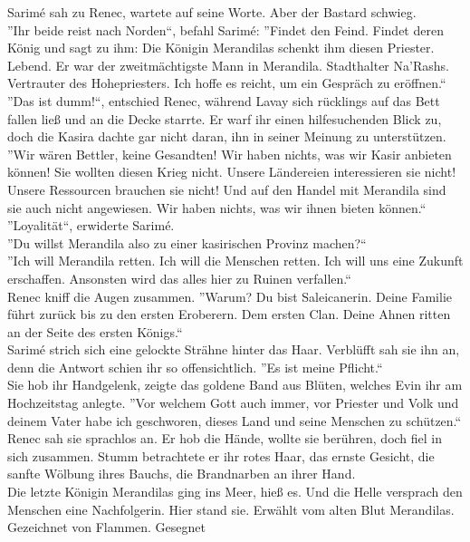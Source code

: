 Sarimé sah zu Renec, wartete auf seine Worte. Aber der Bastard schwieg.\\
''Ihr beide reist nach Norden``, befahl Sarimé: ''Findet den Feind. Findet deren König und 
sagt zu ihm: Die Königin Merandilas schenkt ihm diesen Priester. Lebend. Er war der zweitmächtigste 
Mann in Merandila. Stadthalter Na'Rashs. Vertrauter des Hohepriesters. Ich hoffe es reicht, um ein 
Gespräch zu eröffnen.``\\
''Das ist dumm!``, entschied Renec, während Lavay sich rücklings auf das Bett fallen ließ und an 
die Decke starrte. Er warf ihr einen hilfesuchenden Blick zu, doch die Kasira dachte gar nicht 
daran, ihn in seiner Meinung zu unterstützen.\\
''Wir wären Bettler, keine Gesandten! Wir haben nichts, was wir Kasir anbieten können! Sie wollten 
diesen Krieg nicht. Unsere Ländereien interessieren sie nicht! Unsere Ressourcen brauchen sie 
nicht! Und auf den Handel mit Merandila sind sie auch nicht angewiesen. Wir haben nichts, was wir 
ihnen bieten können.``\\
''Loyalität``, erwiderte Sarimé.\\
''Du willst Merandila also zu einer kasirischen Provinz machen?``\\
''Ich will Merandila retten. Ich will die Menschen retten. Ich will uns eine Zukunft erschaffen. 
Ansonsten wird das alles hier zu Ruinen verfallen.``\\
Renec kniff die Augen zusammen. ''Warum? Du bist Saleicanerin. Deine Familie führt zurück bis zu 
den ersten Eroberern. Dem ersten Clan. Deine Ahnen ritten an der Seite des ersten Königs.``\\
Sarimé strich sich eine gelockte Strähne hinter das Haar. Verblüfft sah sie ihn an, denn die 
Antwort schien ihr so offensichtlich. ''Es ist meine Pflicht.``\\
Sie hob ihr Handgelenk, zeigte das goldene Band aus Blüten, welches Evin ihr am Hochzeitstag 
anlegte. ''Vor welchem Gott auch immer, vor Priester und Volk und deinem Vater habe ich geschworen, 
dieses Land und seine Menschen zu schützen.``\\
Renec sah sie sprachlos an. Er hob die Hände, wollte sie berühren, doch fiel in sich zusammen. 
Stumm betrachtete er ihr rotes Haar, das ernste Gesicht, die sanfte Wölbung ihres Bauchs, die 
Brandnarben an ihrer Hand.\\
Die letzte Königin Merandilas ging ins Meer, hieß es. Und die Helle versprach den Menschen eine 
Nachfolgerin. Hier stand sie. Erwählt vom alten Blut Merandilas. Gezeichnet von Flammen. Gesegnet 

